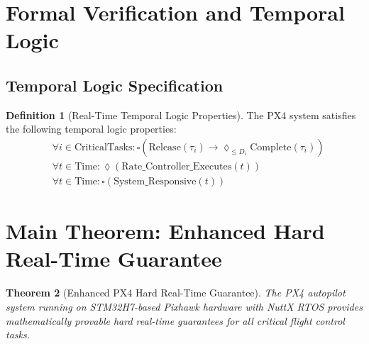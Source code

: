 \documentclass[11pt,a4paper]{article}
\newtheorem{theorem}{Theorem}[section]
\theoremstyle{definition}
\newtheorem{definition}[theorem]{Definition}
\theoremstyle{remark}
\begin{document}
\section{Formal Verification and Temporal Logic}

\subsection{Temporal Logic Specification}

\begin{definition}[Real-Time Temporal Logic Properties]
The PX4 system satisfies the following temporal logic properties:
\begin{align}
&\forall i \in \text{CriticalTasks}: \square(\text{Release}(\tau_i) \rightarrow \lozenge_{\leq D_i} \text{Complete}(\tau_i)) \\
&\forall t \in \text{Time}: \lozenge(\text{Rate\_Controller\_Executes}(t)) \\
&\forall t \in \text{Time}: \square(\text{System\_Responsive}(t))
\end{align}
\end{definition}

\section{Main Theorem: Enhanced Hard Real-Time Guarantee}

\begin{theorem}[Enhanced PX4 Hard Real-Time Guarantee]
The PX4 autopilot system running on STM32H7-based Pixhawk hardware with NuttX RTOS provides mathematically provable hard real-time guarantees for all critical flight control tasks.
\end{theorem}
\end{document}
